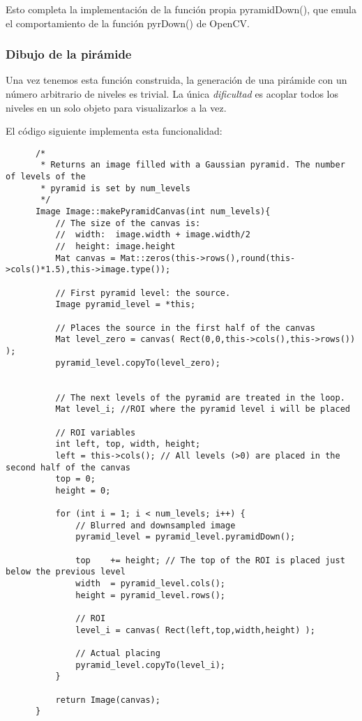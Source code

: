 \documentclass[a4paper, 11pt]{article}
\theoremstyle{definition}
\theoremstyle{theorem}
\begin{document}
  Esto completa la implementación de la función propia pyramidDown(), que emula el comportamiento de la función pyrDown() de OpenCV.

  \subsubsection*{Dibujo de la pirámide}

  Una vez tenemos esta función construida, la generación de una pirámide con un número arbitrario de niveles es trivial. La única \emph{dificultad} es acoplar todos los niveles en un solo objeto para visualizarlos a la vez.

  El código siguiente implementa esta funcionalidad:

  \begin{lstlisting}
      /*
       * Returns an image filled with a Gaussian pyramid. The number of levels of the
       * pyramid is set by num_levels
       */
      Image Image::makePyramidCanvas(int num_levels){
          // The size of the canvas is:
          //  width:  image.width + image.width/2
          //  height: image.height
          Mat canvas = Mat::zeros(this->rows(),round(this->cols()*1.5),this->image.type());

          // First pyramid level: the source.
          Image pyramid_level = *this;

          // Places the source in the first half of the canvas
          Mat level_zero = canvas( Rect(0,0,this->cols(),this->rows()) );
          pyramid_level.copyTo(level_zero);


          // The next levels of the pyramid are treated in the loop.
          Mat level_i; //ROI where the pyramid level i will be placed

          // ROI variables
          int left, top, width, height;
          left = this->cols(); // All levels (>0) are placed in the second half of the canvas
          top = 0;
          height = 0;

          for (int i = 1; i < num_levels; i++) {
              // Blurred and downsampled image
              pyramid_level = pyramid_level.pyramidDown();

              top    += height; // The top of the ROI is placed just below the previous level
              width  = pyramid_level.cols();
              height = pyramid_level.rows();

              // ROI
              level_i = canvas( Rect(left,top,width,height) );

              // Actual placing
              pyramid_level.copyTo(level_i);
          }

          return Image(canvas);
      }
  \end{lstlisting}
\end{document}
